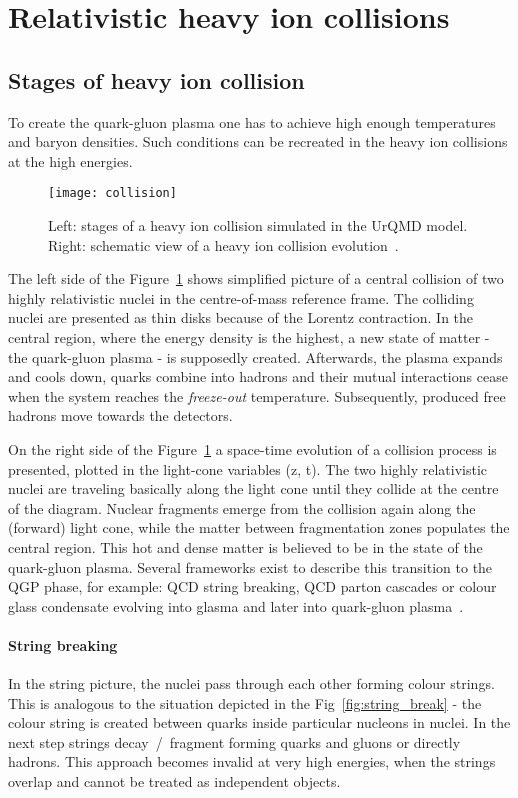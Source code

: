   \section{Relativistic heavy ion collisions}
    \subsection{Stages of heavy ion collision}

      To create the quark-gluon plasma one has to achieve high enough temperatures and baryon densities.
      Such conditions can be recreated in the heavy ion collisions at the high energies.
      \begin{figure}[h]
        \centering
        \texttt{[image: collision]}
        \caption{Left: stages of a heavy ion collision simulated in the UrQMD model. Right: schematic view of a heavy ion collision evolution~\cite{drkisiel}.}
        \label{fig:colision}
      \end{figure}
      The left side of the Figure~\ref{fig:colision} shows simplified picture of a central collision of two highly relativistic nuclei in the centre-of-mass reference frame.
      The colliding nuclei are presented as thin disks because of the Lorentz contraction.
      In the central region, where the energy density is the highest, a new state of matter - the quark-gluon plasma - is supposedly created.
      Afterwards, the plasma expands and cools down, quarks combine into hadrons and their mutual interactions cease when the system reaches the \textit{freeze-out} temperature.
      Subsequently, produced free hadrons move towards the detectors.

      On the right side of the Figure~\ref{fig:colision} a space-time evolution of a collision process is presented, plotted in the light-cone variables (z, t).
      The two highly relativistic nuclei are traveling basically along the light cone until they collide at the centre of the diagram. 
      Nuclear fragments emerge from the collision again along the (forward) light cone, while the matter between fragmentation zones populates the central region.
      This hot and dense matter is believed to be in the state of the quark-gluon plasma.
      Several frameworks exist to describe this transition to the QGP phase, for example: QCD string breaking, QCD parton cascades or colour glass condensate evolving into glasma and later into quark-gluon plasma~\cite{florkowski}.
      \paragraph{String breaking}
      In the string picture, the nuclei pass through each other forming colour strings.
      This is analogous to the situation depicted in the Fig~\ref{fig:string_break} -  the colour string is created between quarks inside particular nucleons in nuclei.
      In the next step strings decay~/~fragment forming quarks and gluons or directly hadrons.
      This approach becomes invalid at very high energies, when the strings overlap and cannot be treated as independent objects.
